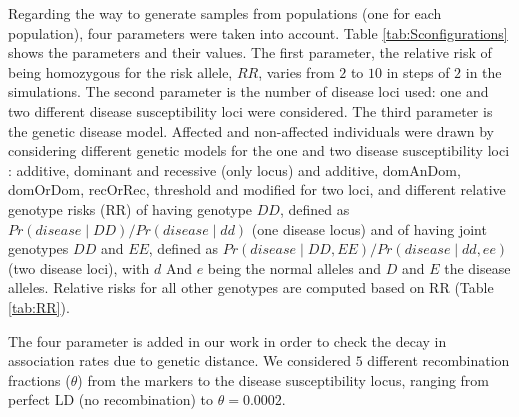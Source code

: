 \documentclass[runningheads]{llncs}
\begin{document}
Regarding the way to generate samples from populations (one for each population), four parameters  were taken into account. Table \ref{tab:Sconfigurations} shows the parameters and their values. The first parameter, the relative risk of being homozygous for the risk allele, $RR$, varies from $2$ to $10$ in steps of $2$ in the simulations. The second parameter is the number of disease loci used: one and two different disease susceptibility loci were considered. The third parameter is the genetic disease model. Affected and non-affected individuals were drawn by considering different genetic models for the one and two disease susceptibility loci \cite{Yu.zz.2005}: additive, dominant and recessive (only locus) and additive, domAnDom, domOrDom, recOrRec, threshold and modified for two loci, and different relative genotype risks (RR) of having genotype $DD$, defined as $Pr(disease\mid DD)/Pr(disease\mid dd)$ (one disease locus) and of having joint genotypes $DD$ and $EE$, defined as $Pr(disease\mid DD,EE)/Pr(disease\mid dd,ee)$ (two disease loci), with $d$ And $e$ being the normal alleles and $D$ and $E$ the disease alleles. Relative risks for all other genotypes are computed based on RR \cite{Fan.zz.2001,Yu.zz.2005} (Table \ref{tab:RR}).


The four parameter is added in our work in order to check the decay in association rates due to genetic distance. We considered $5$ different recombination fractions ($\theta$) from the markers to the disease susceptibility locus, ranging from perfect LD (no recombination) to $\theta=0.0002$.
\end{document}
